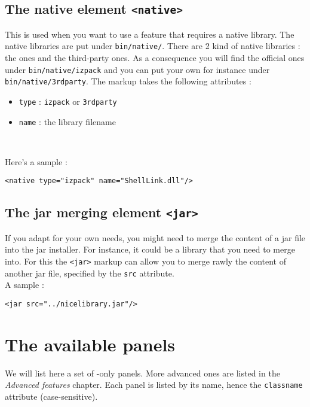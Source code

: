 \subsection{The native element \texttt{<native>}}

This is used when you want to use a feature that requires a native library. The
native libraries are put under \texttt{bin/native/}. There are 2 kind of native
libraries : the \IzPack ones and the third-party ones. As a consequence you will
find the official ones under \texttt{bin/native/izpack} and you can put your own
for instance under \texttt{bin/native/3rdparty}. The markup takes the following
attributes :
\begin{itemize}

  \item \texttt{type} : \texttt{izpack} or \texttt{3rdparty}
  \item \texttt{name} : the library filename

\end{itemize}\

Here's a sample :
\footnotesize
\begin{verbatim}
<native type="izpack" name="ShellLink.dll"/>
\end{verbatim}
\normalsize

\subsection{The jar merging element \texttt{<jar>}}

If you adapt \IzPack for your own needs, you might need to merge the content of
a jar file into the jar installer. For instance, it could be a library that you
need to merge into. For this the \texttt{<jar>} markup can allow you to merge
rawly the content of another jar file, specified by the \texttt{src}
attribute.\\

A sample :
\footnotesize
\begin{verbatim}
<jar src="../nicelibrary.jar"/>
\end{verbatim}
\normalsize

\section{The available panels}

We will list here a set of \Java-only panels. More advanced ones are listed in
the \textit{Advanced features} chapter. Each panel is listed by its name, hence
the \texttt{classname} attribute (case-sensitive).\\

